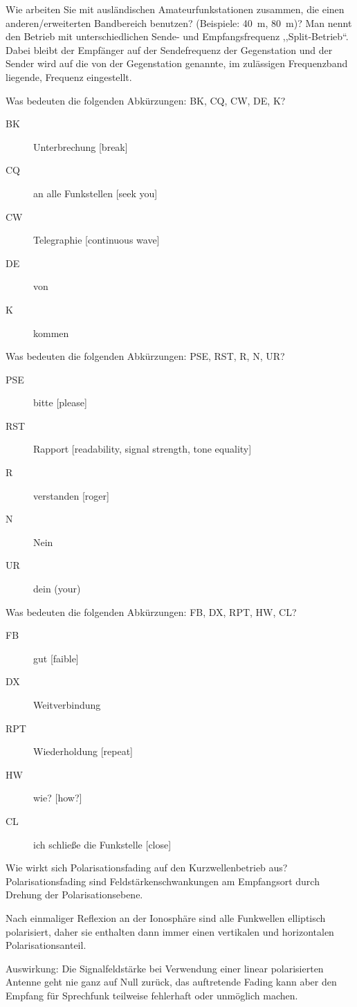 \documentclass[avery5371,grid,frame,a4paper]{flashcards}
\newcommand{\card}[3]{
  \begin{flashcard}[{\chap} -- #1]{#2}#3\end{flashcard}
}
\begin{document}
\card{41}{Wie arbeiten Sie mit ausländischen Amateurfunkstationen zusammen, die einen anderen/erweiterten Bandbereich benutzen? (Beispiele: \SI{40}{\metre}, \SI{80}{\metre})?}{
  Man nennt den Betrieb mit unterschiedlichen Sende- und Empfangsfrequenz ,,Split-Betrieb``. Dabei bleibt der Empfänger auf der Sendefrequenz der Gegenstation und der Sender wird auf die von der Gegenstation genannte, im zulässigen Frequenzband liegende, Frequenz eingestellt.
}
\card{42}{Was bedeuten die folgenden Abkürzungen: BK, CQ, CW, DE, K?}{
  \begin{description}
    \item[BK] Unterbrechung [break]
    \item[CQ] an alle Funkstellen [seek you]
    \item[CW] Telegraphie [continuous wave]
    \item[DE] von
    \item[K] kommen
  \end{description}
}
\card{42}{Was bedeuten die folgenden Abkürzungen: PSE, RST, R, N, UR?}{
  \begin{description}
    \item[PSE] bitte [please]
    \item[RST] Rapport [readability, signal strength, tone equality]
    \item[R] verstanden [roger]
    \item[N] Nein
    \item[UR] dein (your)
  \end{description}
}
\card{42}{Was bedeuten die folgenden Abkürzungen: FB, DX, RPT, HW, CL?}{
  \begin{description}
    \item[FB] gut [faible]
    \item[DX] Weitverbindung
    \item[RPT] Wiederholdung [repeat]
    \item[HW] wie? [how?]
    \item[CL] ich schließe die Funkstelle [close]
  \end{description}
}
\card{43}{Wie wirkt sich Polarisationsfading auf den Kurzwellenbetrieb aus?}{
  \small
  Polarisationsfading sind Feldstärkenschwankungen am Empfangsort durch Drehung der Polarisationsebene.

  \item Nach einmaliger Reflexion an der Ionosphäre sind alle Funkwellen elliptisch polarisiert, daher sie enthalten dann immer einen vertikalen und horizontalen Polarisationsanteil.

  \item Auswirkung: Die Signalfeldstärke bei Verwendung einer linear polarisierten Antenne geht nie ganz auf Null zurück, das auftretende Fading kann aber den Empfang für Sprechfunk teilweise fehlerhaft oder unmöglich machen.
}
\end{document}
